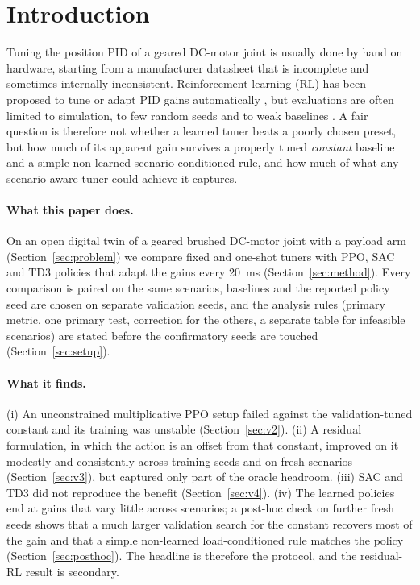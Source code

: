 \section{Introduction}
Tuning the position PID of a geared DC-motor joint is usually done by hand on hardware, starting from a manufacturer datasheet that is incomplete and sometimes internally inconsistent. Reinforcement learning (RL) has been proposed to tune or adapt PID gains automatically \cite{carlucho2017incremental,lawrence2021shallow}, but evaluations are often limited to simulation, to few random seeds and to weak baselines \cite{henderson2018matters,agarwal2021precipice}. A fair question is therefore not whether a learned tuner beats a poorly chosen preset, but how much of its apparent gain survives a properly tuned \emph{constant} baseline and a simple non-learned scenario-conditioned rule, and how much of what any scenario-aware tuner could achieve it captures.

\paragraph*{What this paper does.}
On an open digital twin of a geared brushed DC-motor joint with a payload arm (Section~\ref{sec:problem}) we compare fixed and one-shot tuners with PPO, SAC and TD3 policies that adapt the gains every \SI{20}{ms} (Section~\ref{sec:method}). Every comparison is paired on the same scenarios, baselines and the reported policy seed are chosen on separate validation seeds, and the analysis rules (primary metric, one primary test, correction for the others, a separate table for infeasible scenarios) are stated before the confirmatory seeds are touched (Section~\ref{sec:setup}).

\paragraph*{What it finds.}
(i) An unconstrained multiplicative PPO setup failed against the validation-tuned constant and its training was unstable (Section~\ref{sec:v2}). (ii) A residual formulation, in which the action is an offset from that constant, improved on it modestly and consistently across training seeds and on fresh scenarios (Section~\ref{sec:v3}), but captured only part of the oracle headroom. (iii) SAC and TD3 did not reproduce the benefit (Section~\ref{sec:v4}). (iv) The learned policies end at gains that vary little across scenarios; a post-hoc check on further fresh seeds shows that a much larger validation search for the constant recovers most of the gain and that a simple non-learned load-conditioned rule matches the policy (Section~\ref{sec:posthoc}). The headline is therefore the protocol, and the residual-RL result is secondary.

